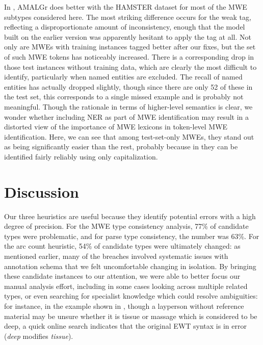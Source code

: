 \documentclass[output=paper,modfonts,nonflat]{langsci/langscibook}
\begin{document}
In , AMALGr does better with the HAMSTER dataset for most of the MWE subtypes considered here. The most striking difference occurs for the weak tag, reflecting a disproportionate amount of inconsistency, enough that the model built on the earlier version was apparently hesitant to apply the tag at all. Not only are MWEs with training instances tagged better after our fixes, but the set of such MWE tokens has noticeably increased. There is a corresponding drop in those test instances without training data, which are clearly the most difficult to identify, particularly when named entities are excluded. The recall of named entities has actually dropped slightly, though since there are only 52 of these in the test set, this corresponds to a single missed example and is probably not meaningful. Though the rationale in terms of higher-level semantics is clear, we wonder whether including NER as part of MWE identification may result in a distorted view of the importance of MWE lexicons in token-level MWE identification. Here, we can see that among test-set-only MWEs, they stand out as being significantly easier than the rest, probably because in  they can be identified fairly reliably using only capitalization.

\section{Discussion}
\largerpage
Our three heuristics are useful because they identify potential errors with a high degree of precision. For the MWE type consistency analysis, 77\% of candidate types were problematic, and for parse type consistency, the number was 63\%. For the arc count heuristic, 54\% of candidate types were ultimately changed: as mentioned earlier, many of the breaches involved systematic issues with annotation schema that we felt uncomfortable changing in isolation. By bringing these candidate instances to our attention, we were able to better focus our manual analysis effort, including in some cases looking across multiple related types, or even searching for specialist knowledge which could resolve ambiguities: for instance, in the example shown in , though a layperson without reference material may be unsure whether it is tissue or massage which is considered to be deep, a quick online search indicates that the original EWT syntax is in error (\textit{deep} modifies \textit{tissue}).
\end{document}
